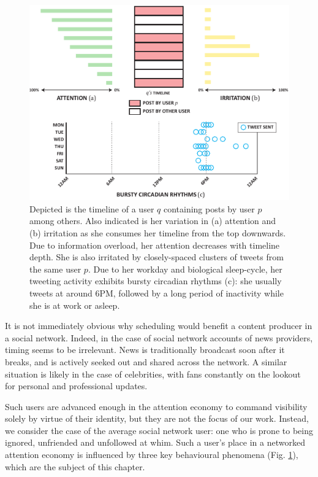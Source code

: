 \documentclass[onecolumn, 12 pt, doublespace, fullpage, letterpaper]{report}
\begin{document}
\begin{figure}%
  \includegraphics[width=\linewidth]{phenomena}
  \caption[Factors influencing attention.]{Depicted is the timeline of a user $q$ containing posts by user $p$ among others. Also indicated is her variation in (a) attention and (b) irritation as she consumes her timeline from the top downwards. Due to information overload, her attention decreases with timeline depth. She is also irritated by closely-spaced clusters of tweets from the same user $p$. Due to her workday and biological sleep-cycle, her tweeting activity exhibits bursty circadian rhythms (c): she usually tweets at around 6PM, followed by a long period of inactivity while she is at work or asleep.}
  \label{fig:phenomena}
\end{figure}

It is not immediately obvious why scheduling would benefit a content producer in a social network. Indeed, in the case of social network accounts of news providers, timing seems to be irrelevant. News is traditionally broadcast soon after it breaks, and is actively seeked out and shared across the network. A similar situation is likely in the case of celebrities, with fans constantly on the lookout for personal and professional updates.

Such users are advanced enough in the attention economy to command visibility solely by virtue of their identity, but they are not the focus of our work. Instead, we consider the case of the average social network user: one who is prone to being ignored, unfriended and unfollowed at whim. Such a user's place in a networked attention economy is influenced by three key behavioural phenomena (Fig. \ref{fig:phenomena}), which are the subject of this chapter.
\end{document}
